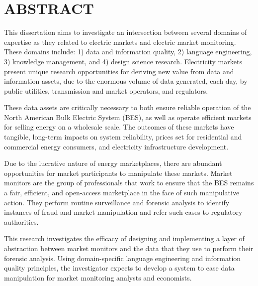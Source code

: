 %
%
%
%  
%

\chapter*{ABSTRACT}

\pagestyle{plain} %
\setcounter{page}{2}

\indent This dissertation aims to investigate an intersection between several domains of expertise as they related to electric markets and electric market monitoring. These domains include: 1) data and information quality, 2) language engineering, 3) knowledge management, and 4) design science research. Electricity markets present unique research opportunities for deriving new value from data and information assets, due to the enormous volume of data generated, each day, by public utilities, transmission and market operators, and regulators. 

These data assets are critically necessary to both ensure reliable operation of the North American Bulk Electric System (BES), as well as operate efficient markets for selling energy on a wholesale scale. The outcomes of these markets have tangible, long-term impacts on system reliability, prices set for residential and commercial energy consumers, and electricity infrastructure development. 

Due to the lucrative nature of energy marketplaces, there are abundant opportunities for market participants to manipulate these markets. Market monitors are the group of professionals that work to ensure that the BES remains a fair, efficient, and open-access marketplace in the face of such manipulative action. They perform routine surveillance and forensic analysis to identify instances of fraud and market manipulation and refer such cases to regulatory authorities. 

This research investigates the efficacy of designing and implementing a layer of abstraction between market monitors and the data that they use to perform their forensic analysis. Using domain-specific language engineering and information quality principles, the investigator expects to develop a system to ease data manipulation for market monitoring analysts and economists.

\pagebreak{}
